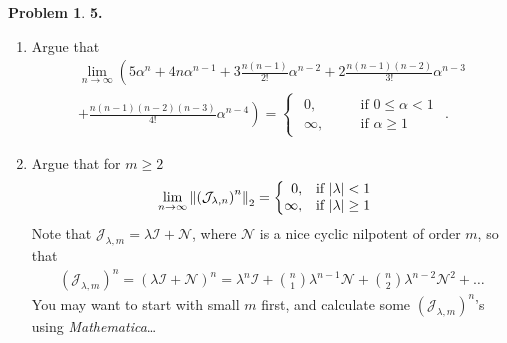 \documentclass{book}
\theoremstyle{definition}
\newtheorem*{prob*}{Problem}
\newcommand{\jor}{\mathcal{J}}
\begin{document}
\begin{prob*}\textbf{5. }\\
	\begin{enumerate}
		\item Argue that
		\begin{align*}
		\lim\limits_{n\to \infty} \left(    5\alpha^n + 4n\alpha^{n-1} + 3\frac{n(n-1)}{2!}\alpha^{n-2} + 2\frac{n(n-1)(n-2)}{3!}\alpha^{n-3}    \right.\\
		 \left.  + \frac{n(n-1)(n-2)(n-3)}{4!}\alpha^{n-4} \right) 
		= \begin{cases}
		\begin{alignedat}{2}
		0, & \quad & \text{if } 0 \leq \alpha < 1\\
		\infty, & \quad & \text{if } \alpha \geq 1
		\end{alignedat}
		\end{cases}.
		\end{align*}
		
		
		
		\item Argue that for $m\geq 2$
		\begin{align*}
		\lim\limits_{n\to \infty}\norm{\left(\jor_{\lambda,n}\right)^n}_2 
		= 
		\begin{cases}
		\begin{alignedat}{2}
		0, & \quad & \text{if } \abs{\lambda} < 1&\\
		\infty, & \quad & \text{if } \abs{\lambda} \geq 1&
		\end{alignedat}
		\end{cases}
		\end{align*}
		Note that $\jor_{\lambda,m} = \lambda\mathcal{I} + \mathcal{N}$, where $\mathcal{N}$ is a nice cyclic nilpotent of order $m$, so that
		\begin{align*}
		\left(\jor_{\lambda,m}\right)^n = \left(\lambda\mathcal{I} + \mathcal{N}\right)^n = 
		\lambda^n \mathcal{I} + {n\choose 1}\lambda^{n-1}\mathcal{N} + {n\choose 2}\lambda^{n-2}\mathcal{N}^2 + \dots
		\end{align*}
		You may want to start with small $m$ first, and calculate some $\left(\jor_{\lambda,m}\right)^n$'s using \textit{Mathematica}\dots
	\end{enumerate}




\end{prob*}
\end{document}
